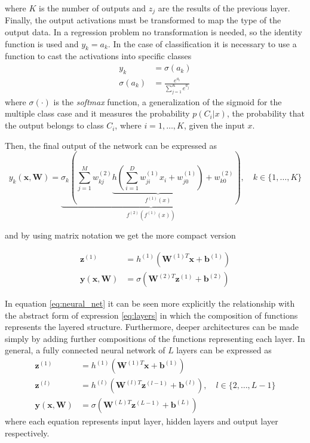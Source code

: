 where $K$ is the number of outputs and $z_j$ are the results of the previous layer. Finally, the output activations must be transformed to map the type of the output data. In a regression problem no transformation is needed, so the identity function is used and $y_k = a_k$. In the case of classification it is necessary to use a function to cast the activations into specific classes
\begin{align*}
    y_k &= \sigma (a_k)\\
    \sigma(a_k) &= \frac{e^{a_i}}{\sum^K_{j=1}e^{a_j}}
\end{align*}
where $\sigma(\cdot)$ is the \textit{softmax} function, a generalization of the sigmoid for the multiple class case and it measures the probability $p(C_i|x)$, the probability that the output belongs to class $C_i$,  where $i=1,\ldots, K$, given the input $x$.

Then, the final output of the network can be expressed as 
\begin{equation}
    y_k(\mathbf{x},\mathbf{W}) = \underbrace{\sigma_k \left(\sum^M_{j=1}w^{(2)}_{kj}\underbrace{h\left(\sum^D_{i=1}w^{(1)}_{ji}x_i+w^{(1)}_{j0}\right)}_{f^{(1)}(x)}+w^{(2)}_{k0}\right)}_{f^{(2)}(f^{(1)}(x))}, \quad k \in \{1,\ldots, K\}
    \label{eq:neural_net}
\end{equation}

and by using matrix notation we get the more compact version

\begin{align*}
    \mathbf{z}^{(1)} &= h^{(1)}\left(\mathbf{W}^{(1)T}\mathbf{x} + \mathbf{b}^{(1)}\right) \\
    \mathbf{y}(\mathbf{x},\mathbf{W})&= \sigma\left(\mathbf{W}^{(2)T}\mathbf{z}^{(1)} + \mathbf{b}^{(2)}\right)
\end{align*}

In equation \eqref{eq:neural_net} it can be seen more explicitly the relationship with the abstract form of expression \eqref{eq:layers} in which the composition of functions represents the layered structure. Furthermore, deeper architectures can be made simply by adding further compositions of the functions representing each layer. In general, a fully connected neural network of $L$ layers can be expressed as
\begin{align*}
    \mathbf{z}^{(1)} &= h^{(1)}\left(\mathbf{W}^{(1)T}\mathbf{x} + \mathbf{b}^{(1)}\right) \\
    \mathbf{z}^{(l)} &= h^{(l)}\left(\mathbf{W}^{(l)T}\mathbf{z}^{(l-1)} + \mathbf{b}^{(l)}\right), \quad l \in \{2,\ldots, L-1 \} \\
    \mathbf{y}(\mathbf{x}, \mathbf{W})  &=\sigma\left(\mathbf{W}^{(L)T}\mathbf{z}^{(L-1)} + \mathbf{b}^{(L)}\right) 
\end{align*}
where each equation represents input layer, hidden layers and output layer respectively.


